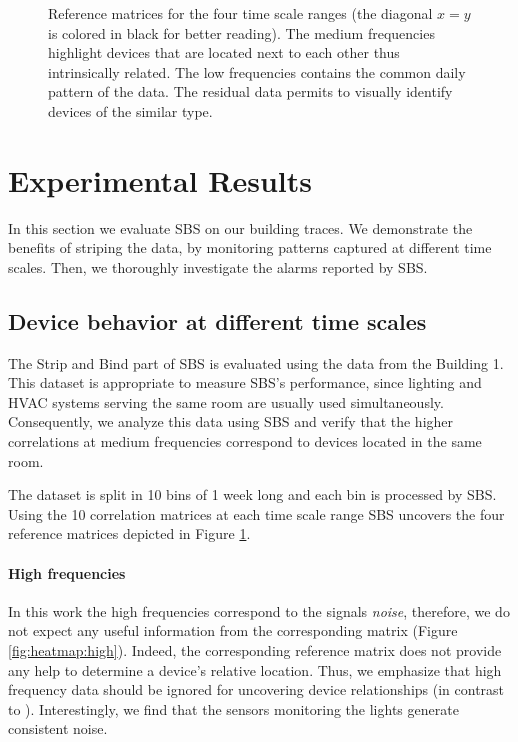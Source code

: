 \begin{figure}[t!]
\caption{Reference matrices for the four time scale ranges (the diagonal $x=y$ is colored in black for better reading). The medium frequencies highlight devices that are located next to each other thus intrinsically related. The low frequencies contains the common daily pattern of the data. The residual data permits to visually identify devices of the similar type.}
\label{fig:heatmap}
\end{figure}

\section{Experimental Results}
\label{eval}
In this section we evaluate SBS on our building traces.  We demonstrate
 the benefits of striping the data, by monitoring patterns captured at different time scales.
Then, we thoroughly investigate the alarms reported by SBS.

\subsection{Device behavior at different time scales}
The Strip and Bind part of SBS is evaluated using the data from the Building 1. %
This dataset is appropriate to measure SBS's performance, since lighting and HVAC systems serving the same room are usually used 
simultaneously.
Consequently, we analyze this data using SBS and verify that the higher correlations at medium frequencies correspond to devices located in the same room. %

The dataset is split in 10 bins of 1 week long and each bin is processed by SBS.
Using the 10 correlation matrices at each time scale range SBS uncovers the four reference matrices depicted in 
Figure \ref{fig:heatmap}.

\paragraph{High frequencies}
In this work the high frequencies correspond to the signals \emph{noise}, 
therefore, we do not expect any useful information from the corresponding matrix (Figure \ref{fig:heatmap:high}).
Indeed, the corresponding reference matrix does not provide any help to determine a device's relative location.
Thus, we emphasize that high frequency data should be ignored for uncovering device relationships (in contrast to \cite{romain:iotapp12}).
Interestingly, we find that the sensors monitoring the lights generate consistent noise. %
  
